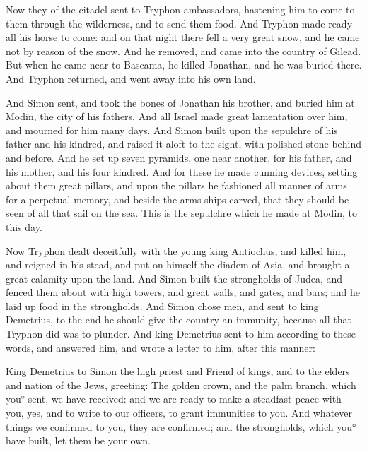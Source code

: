 {Now they of the citadel sent to Tryphon ambassadors, hastening him to come to them through the wilderness, and to send them food.
And Tryphon made ready all his horse to come: and on that night there fell a very great snow, and he came not by reason of the snow. And he removed, and came into the country of Gilead.
But when he came near to Bascama, he killed Jonathan, and he was buried there.
And Tryphon returned, and went away into his own land.
\par }{\PP {}And Simon sent, and took the bones of Jonathan his brother, and buried him at Modin, the city of his fathers.
And all Israel made great lamentation over him, and mourned for him many days.
And Simon built
{} upon the sepulchre of his father and his kindred, and raised it aloft to the sight, with polished stone behind and before.
And he set up seven pyramids, one near another, for his father, and his mother, and his four kindred.
And for these he made cunning devices, setting about them great pillars, and upon the pillars he fashioned
 all manner of arms for a perpetual memory, and beside the
 arms ships carved, that they should be seen of all that sail on the sea.
This is the sepulchre which he made at Modin,
{} to this day.
\par }{\PP {}Now Tryphon dealt deceitfully with the young king Antiochus, and killed him,
and reigned in his stead, and put on himself the diadem of Asia, and brought a great calamity upon the land.
And Simon built the strongholds of Judea, and fenced them about with high towers, and great walls, and gates, and bars; and he laid up food in the strongholds.
And Simon chose men, and sent to king Demetrius, to the end he should give the country an immunity, because all that Tryphon did was to plunder.
And king Demetrius sent to him according to these words, and answered him, and wrote a letter to him, after this manner:
\par }{\PP {}King Demetrius to Simon the high priest and
 Friend of kings, and to the elders and nation of the Jews, greeting:
The golden crown, and the palm branch, which you° sent, we have received: and we are ready to make a
 steadfast peace with you, yes, and to write to our officers, to grant immunities to you.
And whatever things we confirmed to you, they are confirmed; and the strongholds, which you° have built, let them be your own.
}
